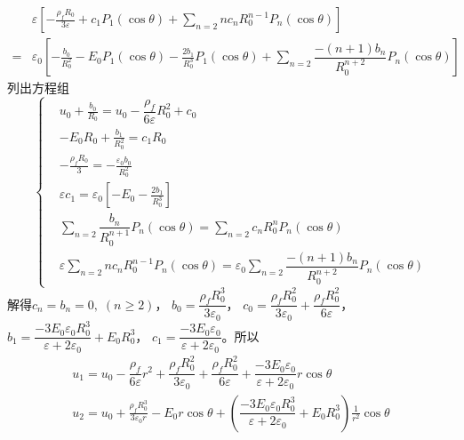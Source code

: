 \documentclass{mynote}
\begin{document}
\begin{solution}
    \begin{align*}
        & \varepsilon \left[ -\frac{\rho_f R_0}{3 \varepsilon} + c_1 P_1(\cos \theta) +  \sum_{n=2} n c_n R_0^{n-1} P_n(\cos \theta)\right] \\
        =& \varepsilon_0 \left[ -\frac{b_0}{R_0^2} - E_0 P_1 (\cos \theta)   - \frac{2b_1}{R_0^3} P_1(\cos \theta) + \sum_{n=2} \dfrac{-(n+1) b_n}{R_0^{n+2}}  P_n(\cos \theta) \right]
    \end{align*}
    列出方程组
    \[
    \left\{
        \begin{aligned}
            &  u_0 + \frac{b_0}{R_0} = u_0 - \dfrac{\rho_f}{6\varepsilon} R_0^2 + c_0  \\
            & - E_0 R_0 + \frac{b_1}{R_0^2} = c_1R_0 \\
            & -\frac{\rho_f R_0}{3} = -\frac{\varepsilon_0 b_0}{R_0^2} \\
            & \varepsilon c_1 = \varepsilon_0 \left[ - E_0  - \frac{2b_1}{R_0^3}\right] \\
            & \sum_{n=2} \dfrac{b_n}{R_0^{n+1}}  P_n(\cos \theta) = \sum_{n=2} c_n R_0^n P_n(\cos \theta) \\
            & \varepsilon \sum_{n=2} n c_n R_0^{n-1} P_n(\cos \theta) = \varepsilon_0 \sum_{n=2} \dfrac{-(n+1) b_n}{R_0^{n+2}}  P_n(\cos \theta)
        \end{aligned} 
    \right.    
    \]
    解得$c_n = b_n = 0,\; (n \geq 2)$，
    $b_0 = \dfrac{\rho_f R_0^3}{3 \varepsilon_0}$，
    $c_0 = \dfrac{\rho_f R_0^2}{3 \varepsilon_0} + \dfrac{\rho_f R_0^2}{6 \varepsilon}$，
    $b_1 = \dfrac{-3 E_0 \varepsilon_0 R_0^3}{\varepsilon + 2 \varepsilon_0} + E_0 R_0^3$，
    $c_1 = \dfrac{-3E_0 \varepsilon_0}{\varepsilon + 2 \varepsilon_0}$。所以 
    \begin{gather*}
        u_1 = u_0 - \dfrac{\rho_f}{6\varepsilon} r^2 +  \dfrac{\rho_f R_0^2}{3 \varepsilon_0} + \dfrac{\rho_f R_0^2}{6 \varepsilon} + \dfrac{-3E_0 \varepsilon_0}{\varepsilon + 2 \varepsilon_0} r \cos \theta \\
        u_2 = u_0 + \frac{\rho_f R_0^3 }{3 \varepsilon_0 r} - E_0r \cos \theta + \left(  \dfrac{-3 E_0 \varepsilon_0 R_0^3}{\varepsilon + 2 \varepsilon_0} + E_0 R_0^3 \right)\frac{1}{r^2} \cos \theta
    \end{gather*}
\end{solution}
\end{document}
